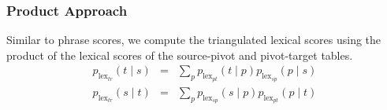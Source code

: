 \documentclass[11pt]{article}
\begin{document}
\subsubsection{Product Approach}	Similar to phrase scores, we compute the triangulated lexical scores using the product of the lexical scores of the source-pivot and pivot-target tables.   
	\begin{eqnarray}
        p_{\mathrm{lex}_{tr}}(t \mid s) &=& \sum_{p} p_{\mathrm{lex}_{pt}}(t \mid p) p_{\mathrm{lex}_{sp}}(p \mid s) \\
        p_{\mathrm{lex}_{tr}}(s \mid t) &=& \sum_{p} p_{\mathrm{lex}_{sp}}(s \mid p) p_{\mathrm{lex}_{pt}}(p \mid t)
	\end{eqnarray}

\end{document}
